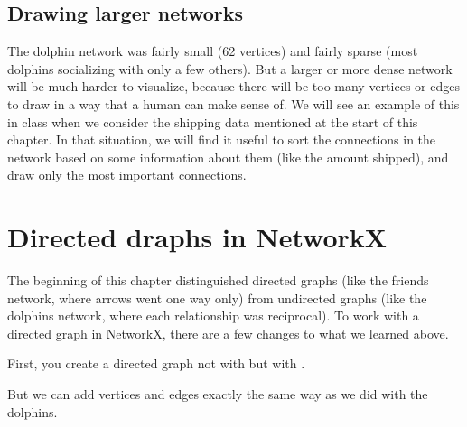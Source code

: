 \documentclass[letterpaper,10pt,english]{jupyterBook}
\begin{document}
\subsection{Drawing larger networks}
\label{\detokenize{chapter-15-networks:drawing-larger-networks}}
\sphinxAtStartPar
The dolphin network was fairly small (62 vertices) and fairly sparse (most dolphins socializing with only a few others).  But a larger or more dense network will be much harder to visualize, because there will be too many vertices or edges to draw in a way that a human can make sense of.  We will see an example of this in class when we consider the shipping data mentioned at the start of this chapter.  In that situation, we will find it useful to sort the connections in the network based on some information about them (like the amount shipped), and draw only the most important connections.


\section{Directed draphs in NetworkX}
\label{\detokenize{chapter-15-networks:directed-draphs-in-networkx}}
\sphinxAtStartPar
The beginning of this chapter distinguished directed graphs (like the friends network, where arrows went one way only) from undirected graphs (like the dolphins network, where each relationship was reciprocal).  To work with a directed graph in NetworkX, there are a few changes to what we learned above.

\sphinxAtStartPar
First, you create a directed graph not with  but with .

\begin{sphinxVerbatim}[commandchars=\\\{\}]
  
\end{sphinxVerbatim}

\sphinxAtStartPar
But we can add vertices and edges exactly the same way as we did with the dolphins.
\end{document}
